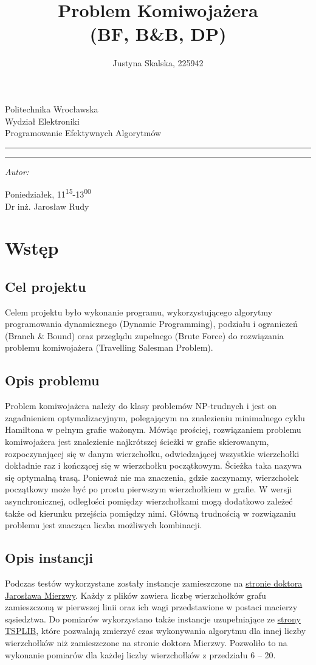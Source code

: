 \documentclass[12pt,a4paper,titlepage]{article}
\author{Justyna Skalska, 225942}
\title{Problem Komiwojażera\\
(BF, B\&B, DP)}
\makeatletter
\newcommand{\linia}{\rule{\linewidth}{0.4mm}}
\renewcommand{\maketitle}{\begin{titlepage}
    \vspace*{1cm}
    \begin{center}\small
    Politechnika Wrocławska\\
    Wydział Elektroniki\\
    Programowanie Efektywnych Algorytmów
    \end{center}
    \vspace{3cm}
    \noindent\linia
    \begin{center}
      \LARGE \textsc{\@title}
         \end{center}
     \linia
    \vspace{0.5cm}
    \begin{flushright}
    \begin{minipage}{7cm}
    \textit{\small Autor:}\\
    \normalsize \textsc{\@author} \par
    \end{minipage}
    \vspace{5cm}

     {\small Poniedziałek, 11\textsuperscript{15}-13\textsuperscript{00}}\\
        Dr inż. Jarosław Rudy
     \end{flushright}
    \vspace*{\stretch{6}}
    \begin{center}
    \@date
    \end{center}
  \end{titlepage}
}
\makeatother
\begin{document}
\maketitle
\tableofcontents

\newpage

\section{Wstęp}
\subsection{Cel projektu}
Celem projektu było wykonanie programu, wykorzystującego algorytmy programowania
dynamicznego (Dynamic Programming), podziału i ograniczeń (Branch \& Bound) oraz przeglądu zupełnego (Brute Force) do rozwiązania problemu komiwojażera (Travelling Salesman Problem).

\subsection{Opis problemu}
Problem komiwojażera należy do klasy problemów NP-trudnych i jest on zagadnieniem optymalizacyjnym, polegającym na znalezieniu minimalnego cyklu Hamiltona w pełnym grafie ważonym. Mówiąc prościej, rozwiązaniem problemu komiwojażera jest znalezienie najkrótszej ścieżki w grafie skierowanym, rozpoczynającej się w danym wierzchołku, odwiedzającej wszystkie wierzchołki dokładnie raz i kończącej się w wierzchołku początkowym. Ścieżka taka nazywa się optymalną trasą. Ponieważ nie ma znaczenia, gdzie zaczynamy, wierzchołek początkowy może być po prostu pierwszym wierzchołkiem w grafie. W wersji asynchronicznej, odległości pomiędzy wierzchołkami mogą dodatkowo zależeć także od kierunku przejścia pomiędzy nimi. Główną trudnością w rozwiązaniu problemu jest znacząca liczba możliwych kombinacji.

\subsection{Opis instancji}
Podczas testów wykorzystane zostały instancje zamieszczone na  \href{http://jaroslaw.mierzwa.staff.iiar.pwr.wroc.pl/pea-stud/tsp/}{stronie doktora Jarosława Mierzwy}. Każdy z plików zawiera liczbę wierzchołków grafu zamieszczoną w pierwszej linii oraz ich wagi przedstawione w postaci macierzy sąsiedztwa. Do pomiarów wykorzystano także instancje uzupełniające ze \href{https://www.iwr.uni-heidelberg.de/groups/comopt/software/TSPLIB95/}{strony TSPLIB}, które pozwalają zmierzyć czas wykonywania algorytmu dla innej liczby wierzchołków niż zamieszczone na stronie doktora Mierzwy. Pozwoliło to na wykonanie pomiarów dla każdej liczby wierzchołków z przedziału 6 -- 20.
\end{document}

